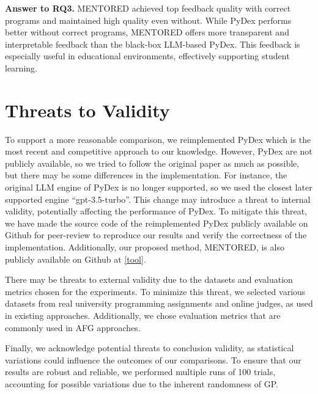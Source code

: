 \documentclass[10pt,conference]{IEEEtran}
\begin{document}
        \begin{tcolorbox}
            \textbf{Answer to RQ3.}
            MENTORED achieved top feedback quality with correct programs and maintained high quality even without. While PyDex performs better without correct programs, MENTORED offers more transparent and interpretable feedback than the black-box LLM-based PyDex. This feedback is especially useful in educational environments, effectively supporting student learning.
        \end{tcolorbox}

        

\section{Threats to Validity}
    To support a more reasonable comparison, we reimplemented PyDex which is the most recent and competitive approach to our knowledge. However, PyDex are not publicly available, so we tried to follow the original paper as much as possible, but there may be some differences in the implementation. For instance, the original LLM engine of PyDex is no longer supported, so we used the closest later supported engine ``gpt-3.5-turbo''. This change may introduce a threat to internal validity, potentially affecting the performance of PyDex. To mitigate this threat, we have made the source code of the reimplemented PyDex publicly available on Github for peer-review to reproduce our results and verify the correctness of the implementation. Additionally, our proposed method, MENTORED, is also publicly available on Github at \ref{tool}.

    There may be threats to external validity due to the datasets and evaluation metrics chosen for the experiments. To minimize this threat, we selected various datasets from real university programming assignments and online judges, as used in existing approaches. Additionally, we chose evaluation metrics that are commonly used in AFG approaches.

    Finally, we acknowledge potential threats to conclusion validity, as statistical variations could influence the outcomes of our comparisons. To ensure that our results are robust and reliable, we performed multiple runs of 100 trials, accounting for possible variations due to the inherent randomness of GP.
\end{document}
